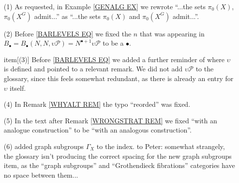 \documentclass{article}
\begin{document}
\begin{itemize}

\item[(1)] As requested, in Example \ref{GENALG EX} we rewrote ``...the sets $\pi_0(X)$, $\pi_0(X^G)$ admit...'' as ``...the sets $\pi_0(X)$ and $\pi_0(X^G)$ admit...''.

\item[(2)] Before \eqref{BARLEVELS EQ} we
fixed the $n$ that was appearing in $B_{\bullet} = 
B_{\bullet}(N,N,\upsilon \mathcal{P})
= N^{\bullet+1} \upsilon \mathcal{P}$
to be a $\bullet$.

item[(3)] Before \eqref{BARLEVELS EQ} we added a further reminder of where $\upsilon$ is defined and pointed to a relevant remark. We did not add $\upsilon \mathcal{P}$ to the glossary, since this feels somewhat redundant, as there is already an entry for $\upsilon$ itself.


\item[(4)] In Remark \ref{WHYALT REM} the typo ``reorded'' was fixed.

\item[(5)]
In the text after Remark \ref{WRONGSTRAT REM} we fixed
``with an analogue construction'' to be 
``with an analogous construction''.

\item[(6)] added graph subgroups $\Gamma_X$ to the index. {\color{red} to Peter: somewhat strangely, the glossary isn't producing the correct spacing for the new graph subgroups item, as the ``graph subgroups'' and ``Grothendieck fibrations'' categories have no space between them...}

        
\end{itemize}









{}

\end{document}
